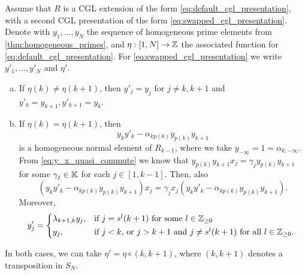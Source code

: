 \begin{theorem}\label{thm:y_prime_swapped_cgl}
	Assume that $R$ is a CGL extension of the form \eqref{eq:default_cgl_presentation}, with a second CGL presentation of the form \eqref{eq:swapped_cgl_presentation}. Denote with $y_1, \dots, y_N$ the sequence of homogeneous prime elements from \cref{thm:homogeneous_primes}, and $\eta : [1, N] \to \mathbb{Z}$ the associated function for \eqref{eq:default_cgl_presentation}. For \eqref{eq:swapped_cgl_presentation} we write $y'_1, \dots, y'_N$ and $\eta'$.
	\begin{enumerate}[(a)]
		\item If $\eta(k) \neq \eta(k+1)$, then $y'_j = y_j$ for $j \neq k, k+1$ and $y'_k = y_{k+1},
			      y'_{k+1} = y_k$.

		\item \label{itm:eta_k_is_eta_k_plus_one} If $\eta(k) = \eta(k+1)$,
		      then
		      \begin{equation*}
			      y_k y'_k - \alpha_{k p(k)} y_{p(k)} y_{k+1}
		      \end{equation*}
		      is a homogeneous normal element of $R_{k-1}$, where we take $y_{-\infty} = 1 =
			      \alpha_{k, -\infty}$. From \cref{eq:y_x_quasi_commute} we know that $y_{p(k)}y_{k+1}
			      x_j = \gamma_j y_{p(k)}y_{k+1}$ for some $\gamma_j \in \mathbb{K}$ for each $j \in [1, k-1]$.
		      Then, also
		      \begin{equation*}
			      (y_ky'_k - \alpha_{kp(k)}y_{p(k)}y_{k+1})x_j = \gamma_j x_j (y_ky'_k - \alpha_{kp(k)}y_{p(k)}y_{k+1}).
		      \end{equation*}
		      Moreover,
		      \begin{equation}\label{eq:y_prime_in_swapped_cgl}
			      y'_j = \begin{dcases*}
				      \lambda_{k+1,k}y_j, & if $j=s^l(k+1)$ for some $l \in \bbZ_{\geq 0}$                               \\
				      y_j,                & if $j < k$, or $j>k+1$ and $j \neq s^l (k+1)$ for all $l \in \bbZ_{\geq 0}$.
			      \end{dcases*}
		      \end{equation}
	\end{enumerate}
	In both cases, we can take $\eta' = \eta \circ (k,k+1)$, where $(k, k+1)$ denotes a transposition in $S_N$.
\end{theorem}
